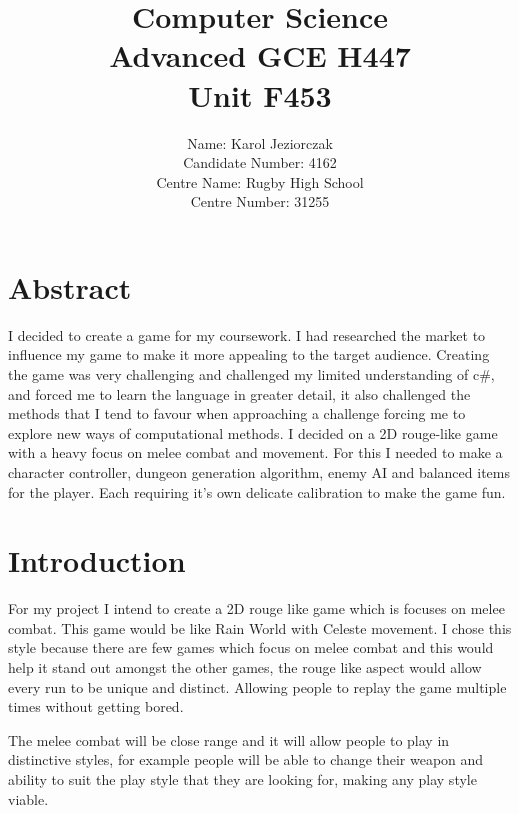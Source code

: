 \documentclass{article}
\newcommand{\parBr}{\vspace{5mm}}%
\begin{document}
\title{Computer Science \\ Advanced GCE H447 \\ Unit F453 \\[2\baselineskip]}
\author{\large Name: Karol Jeziorczak \\ Candidate Number: 4162 \\ Centre Name: Rugby High School \\ Centre Number: 31255 }
\date{}
\maketitle
\newpage
\tableofcontents
\newpage
\listoffigures
\newpage

\section*{Abstract}
I decided to create a game for my coursework. I had researched the market to influence my game to make it more appealing to the target audience. Creating the game was very challenging and challenged my  limited understanding of c\#, and forced me to learn the language in greater detail, it also challenged the methods that I tend to favour when approaching a challenge forcing me to explore new ways of computational methods. I decided on a 2D rouge-like game with a heavy focus on melee combat and movement. For this I needed to make a character controller, dungeon generation algorithm, enemy AI and balanced items for the player. Each requiring it's own delicate calibration to make the game fun. 

\section{Introduction}
For my project I intend to create a 2D rouge like game which is focuses on melee combat. This game would be like Rain World with Celeste movement. I chose this style because there are few games which focus on melee combat and this would help it stand out amongst the other games, the rouge like aspect would allow every run to be unique and distinct. Allowing people to replay the game multiple times without getting bored.

\parBr

The melee combat will be close range and it will allow people to play in distinctive styles, for example people will be able to change their weapon and ability to suit the play style that they are looking for, making any play style viable.
\end{document}
